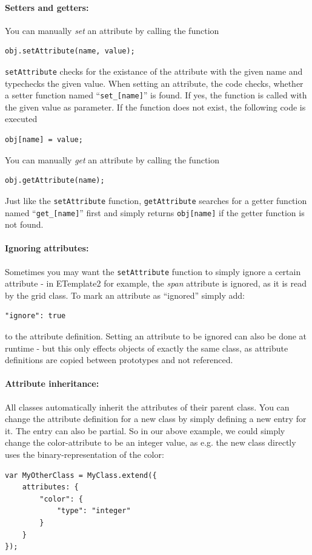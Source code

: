 \documentclass[10pt,a4paper]{report}
\begin{document}
\paragraph{Setters and getters:}
You can manually \textit{set} an attribute by calling the function
\begin{verbatim}
obj.setAttribute(name, value);
\end{verbatim}
\texttt{setAttribute} checks for the existance of the attribute with the given name and typechecks the given value. When setting an attribute, the code checks, whether a setter function named ``\texttt{set\_[name]}'' is found. If yes, the function is called with the given value as parameter. If the function does not exist, the following code is executed
\begin{verbatim}
obj[name] = value;
\end{verbatim}

You can manually \textit{get} an attribute by calling the function
\begin{verbatim}
obj.getAttribute(name);
\end{verbatim}
Just like the \texttt{setAttribute} function, \texttt{getAttribute} searches for a getter function named ``\texttt{get\_[name]}'' first and simply returns \texttt{obj[name]} if the getter function is not found.

\paragraph{Ignoring attributes:}
Sometimes you may want the \texttt{setAttribute} function to simply ignore a certain attribute - in ETemplate2 for example, the \textit{span} attribute is ignored, as it is read by the grid class. To mark an attribute as ``ignored'' simply add:
\begin{verbatim}
"ignore": true
\end{verbatim}
to the attribute definition. Setting an attribute to be ignored can also be done at runtime - but this only effects objects of exactly the same class, as attribute definitions are copied between prototypes and not referenced.

\paragraph{Attribute inheritance:}
All classes automatically inherit the attributes of their parent class. You can change the attribute definition for a new class by simply defining a new entry for it. The entry can also be partial. So in our above example, we could simply change the color-attribute to be an integer value, as e.g. the new class directly uses the binary-representation of the color:
\begin{verbatim}
var MyOtherClass = MyClass.extend({
    attributes: {
        "color": {
            "type": "integer"
        }
    }
});
\end{verbatim}
\end{document}
